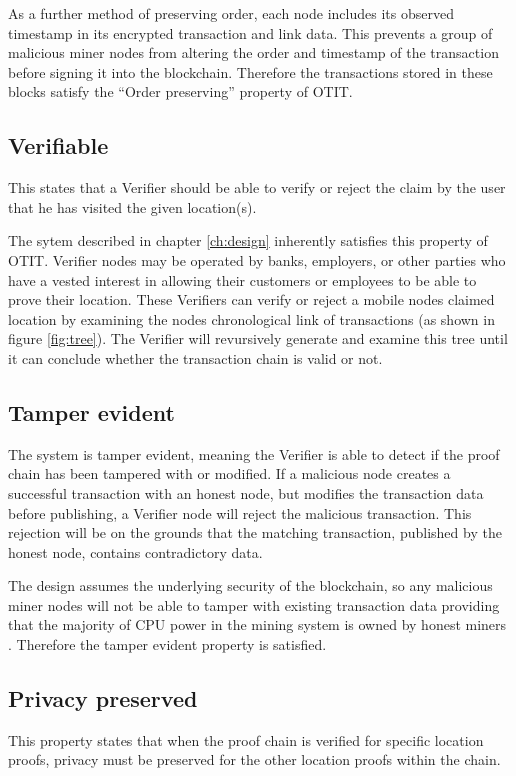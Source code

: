 As a further method of preserving order, each node includes its observed timestamp in its encrypted transaction and link data. This prevents a group of malicious miner nodes from altering the order and timestamp of the transaction before signing it into the blockchain. Therefore the transactions stored in these blocks satisfy the ``Order preserving'' property of OTIT.

\subsection{Verifiable}
This states that a Verifier should be able to verify or reject the claim by the user that he has visited the given location(s).

The sytem described in chapter \ref{ch:design} inherently satisfies this property of OTIT. Verifier nodes may be operated by banks, employers, or other parties who have a vested interest in allowing their customers or employees to be able to prove their location. These Verifiers can verify or reject a mobile nodes claimed location by examining the nodes chronological link of transactions (as shown in figure \ref{fig:tree}). The Verifier will revursively generate and examine this tree until it can conclude whether the transaction chain is valid or not.

\subsection{Tamper evident}
The system is tamper evident, meaning the Verifier is able to detect if the proof chain has been tampered with or modified. If a malicious node creates a successful transaction with an honest node, but modifies the transaction data before publishing, a Verifier node will reject the malicious transaction. This rejection will be on the grounds that the matching transaction, published by the honest node, contains contradictory data.

The design assumes the underlying security of the blockchain, so any malicious miner nodes will not be able to tamper with existing transaction data providing that the majority of CPU power in the mining system is owned by honest miners \cite{bitcoin}. Therefore the tamper evident property is satisfied.

\subsection{Privacy preserved}
This property states that when the proof chain is verified for specific location proofs, privacy must be preserved for the other location proofs within the chain.


